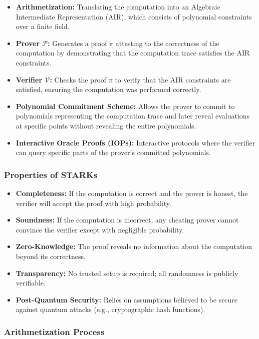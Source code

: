 \documentclass{article}
\theoremstyle{plain}
\theoremstyle{definition}
\theoremstyle{remark}
\theoremstyle{problem}
\begin{document}
\begin{itemize}
    \item \textbf{Arithmetization:} Translating the computation into an Algebraic Intermediate Representation (AIR), which consists of polynomial constraints over a finite field.
    \item \textbf{Prover $\mathcal{P}$:} Generates a proof $\pi$ attesting to the correctness of the computation by demonstrating that the computation trace satisfies the AIR constraints.
    \item \textbf{Verifier $\mathcal{V}$:} Checks the proof $\pi$ to verify that the AIR constraints are satisfied, ensuring the computation was performed correctly.
    \item \textbf{Polynomial Commitment Scheme:} Allows the prover to commit to polynomials representing the computation trace and later reveal evaluations at specific points without revealing the entire polynomials.
    \item \textbf{Interactive Oracle Proofs (IOPs):} Interactive protocols where the verifier can query specific parts of the prover's committed polynomials.
\end{itemize}

\subsubsection{Properties of STARKs}

\begin{itemize}
    \item \textbf{Completeness:} If the computation is correct and the prover is honest, the verifier will accept the proof with high probability.
    \item \textbf{Soundness:} If the computation is incorrect, any cheating prover cannot convince the verifier except with negligible probability.
    \item \textbf{Zero-Knowledge:} The proof reveals no information about the computation beyond its correctness.
    \item \textbf{Transparency:} No trusted setup is required; all randomness is publicly verifiable.
    \item \textbf{Post-Quantum Security:} Relies on assumptions believed to be secure against quantum attacks (e.g., cryptographic hash functions).
\end{itemize}

\subsubsection{Arithmetization Process}
\end{document}
